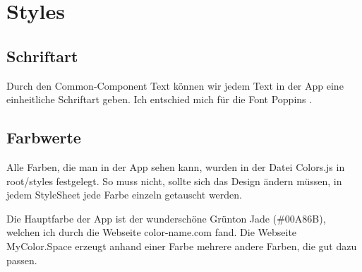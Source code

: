 \section{Styles}
\subsection{Schriftart}
Durch den Common-Component Text können wir jedem Text in der App eine einheitliche Schriftart geben.
Ich entschied mich für die Font Poppins \cite{poppins}.

\subsection{Farbwerte}
Alle Farben, die man in der App sehen kann, wurden in der Datei Colors.js in root/styles festgelegt.
So muss nicht, sollte sich das Design ändern müssen, in jedem StyleSheet jede Farbe einzeln
getauscht werden.

Die Hauptfarbe der App ist der wunderschöne Grünton Jade (\#00A86B), welchen ich durch die Webseite
color-name.com \cite{colorName} fand. Die Webseite MyColor.Space \cite{myColorSpace} erzeugt anhand
einer Farbe mehrere andere Farben, die gut dazu passen.